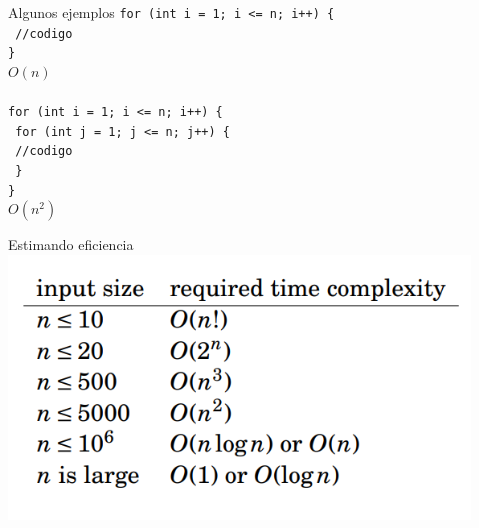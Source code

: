 \documentclass{beamer}
\begin{document}
\begin{frame}{Algunos ejemplos}
    \texttt{for (int i = 1; i <= n; i++) \{}\\
    \texttt{    //codigo}\\
    \texttt{\}}\\
    $O(n)$\\

    \hspace{1cm}\\

    \texttt{for (int i = 1; i <= n; i++) \{}\\
    \texttt{    for (int j = 1; j <= n; j++) \{}\\
    \texttt{        //codigo}\\
    \texttt{ \}\\ \}}\\
    $O(n^2)$
\end{frame}

\begin{frame}{Estimando eficiencia}
    \centering
    \includegraphics[height=7cm,keepaspectratio]{img/estimaciones.png}
\end{frame}
\end{document}
